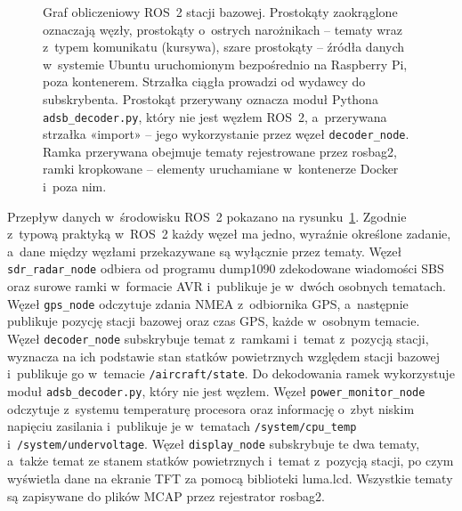 \begin{figure}[!htb]
\caption{Graf obliczeniowy ROS~2 stacji bazowej. Prostokąty zaokrąglone
oznaczają węzły, prostokąty o~ostrych narożnikach -- tematy wraz z~typem
komunikatu (kursywa), szare prostokąty -- źródła danych w~systemie Ubuntu
uruchomionym bezpośrednio na Raspberry Pi, poza kontenerem. Strzałka ciągła
prowadzi od wydawcy do subskrybenta. Prostokąt przerywany oznacza moduł Pythona
\texttt{adsb\_decoder.py}, który nie jest węzłem ROS~2, a~przerywana strzałka
«import» -- jego wykorzystanie przez węzeł \texttt{decoder\_node}. Ramka
przerywana obejmuje tematy rejestrowane przez rosbag2, ramki kropkowane --
elementy uruchamiane w~kontenerze Docker i~poza nim.}
\label{rys:graf_ros}
\end{figure}

Przepływ danych w~środowisku ROS~2 pokazano na rysunku~\ref{rys:graf_ros}. Zgodnie z~typową praktyką w~ROS~2 każdy węzeł ma jedno, wyraźnie określone zadanie, a~dane między węzłami przekazywane są wyłącznie przez tematy. Węzeł \texttt{sdr\_radar\_node} odbiera od programu dump1090 zdekodowane wiadomości SBS oraz surowe ramki w~formacie AVR i~publikuje je w~dwóch osobnych tematach. Węzeł \texttt{gps\_node} odczytuje zdania NMEA z~odbiornika GPS, a~następnie publikuje pozycję stacji bazowej oraz czas GPS, każde w~osobnym temacie. Węzeł \texttt{decoder\_node} subskrybuje temat z~ramkami i~temat z~pozycją stacji, wyznacza na ich podstawie stan statków powietrznych względem stacji bazowej i~publikuje go w~temacie \texttt{/aircraft/state}. Do dekodowania ramek wykorzystuje moduł \texttt{adsb\_decoder.py}, który nie jest węzłem. Węzeł \texttt{power\_monitor\_node} odczytuje z~systemu temperaturę procesora oraz informację o~zbyt niskim napięciu zasilania i~publikuje je w~tematach \texttt{/system/cpu\_temp} i~\texttt{/system/undervoltage}. Węzeł \texttt{display\_node} subskrybuje te dwa tematy, a~także temat ze stanem statków powietrznych i~temat z~pozycją stacji, po czym wyświetla dane na ekranie TFT za pomocą biblioteki luma.lcd. Wszystkie tematy są zapisywane do plików MCAP przez rejestrator rosbag2.


